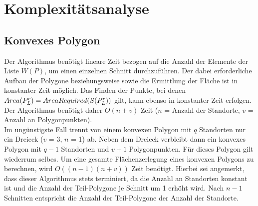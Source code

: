 \documentclass[ngerman]{seminarbeitrag}
\begin{document}
\section{Komplexitätsanalyse}\label{komplex}
\subsection{Konvexes Polygon}
Der Algorithmus \con benötigt lineare Zeit bezogen auf die Anzahl der Elemente der Liste $W(P)$, um einen einzelnen Schnitt durchzuführen. Der dabei erforderliche Aufbau der Polygone \prl beziehungsweise \pll sowie die Ermittlung der Fläche ist in konstanter Zeit möglich. Das Finden der Punkte, bei denen $Area(P_{L}^{r}) = AreaRequired(S(P_{L}^{r}))$ gilt, kann ebenso in konstanter Zeit erfolgen. Der Algorithmus \con benötigt daher $O(n+v)$ Zeit ($n$ = Anzahl der Standorte, $v$ = Anzahl an Polygonpunkten).\\
Im ungünstigste Fall trennt \con von einem konvexen Polygon mit $q$ Standorten nur ein Dreieck ($v$ = 3, $n$ = 1) ab. Neben dem Dreieck verbleibt dann ein konvexes Polygon mit $q-1$ Standorten und $v+1$ Polygonpunkten. Für dieses Polygon gilt wiederrum selbes. Um eine gesamte Flächenzerlegung eines konvexen Polygons zu berechnen, wird $O((n-1)(n+v))$ Zeit benötigt. 
Hierbei sei angemerkt, dass dieser Algorithmus stets terminiert, da die Anzahl an Standorten konstant ist und die Anzahl der Teil-Polygone je Schnitt um 1 erhöht wird. Nach $n-1$ Schnitten entspricht die Anzahl der Teil-Polygone der Anzahl der Standorte.
\end{document}
